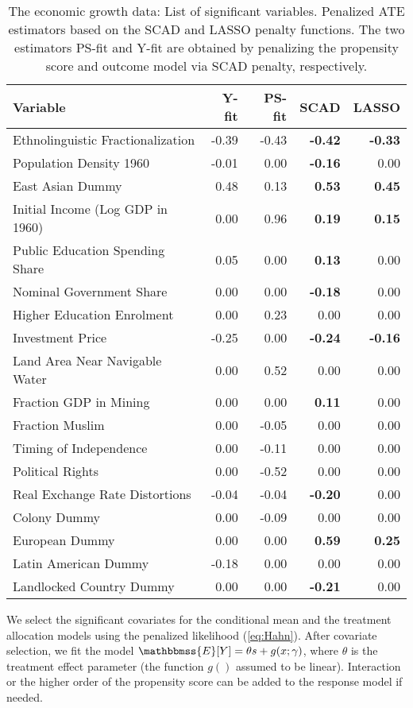 \documentclass[11pt]{statsoc}
\begin{document}
\begin{table}
\caption{The economic growth data: List of significant variables. Penalized ATE estimators based on the SCAD and LASSO penalty functions. The two estimators PS-fit and Y-fit are obtained by penalizing the propensity score and outcome model via SCAD penalty, respectively. }\centering
\begin{tabular}{| l |rrrr|} \hline
  Variable   & Y-fit&PS-fit& SCAD& LASSO\\ \hline
 Ethnolinguistic Fractionalization &-0.39&-0.43& \textbf{-0.42}& \textbf{-0.33}\\
Population Density 1960 &-0.01 &0.00& \textbf{-0.16}& 0.00\\
 East Asian Dummy &0.48 &0.13&\textbf{0.53}& \textbf{0.45}\\
 Initial Income (Log GDP in 1960)    &0.00 &0.96&\textbf{0.19}& \textbf{0.15}\\ 
Public Education Spending Share    &0.05 &0.00&\textbf{0.13}&0.00\\ 
Nominal Government Share    &0.00 &0.00&\textbf{-0.18}&0.00  \\ 
Higher Education Enrolment &0.00 &0.23&0.00&0.00 \\ 
Investment Price    &-0.25 &0.00&\textbf{-0.24}& \textbf{-0.16} \\ 
Land Area Near Navigable Water    &0.00 &0.52&0.00&0.00\\ 
 Fraction GDP in Mining    &0.00 &0.00&\textbf{0.11}&0.00\\
 Fraction Muslim   &0.00 &-0.05&0.00&0.00\\
 Timing of Independence    &0.00 &-0.11&0.00&0.00\\
 Political Rights    &0.00 &-0.52&0.00&0.00\\
 Real Exchange Rate Distortions   &-0.04 &-0.04&\textbf{-0.20}&0.00\\
 Colony Dummy  &0.00 &-0.09&0.00&0.00\\
 European Dummy    &0.00 &0.00&\textbf{0.59}& \textbf{0.25}\\
 Latin American Dummy   &-0.18 &0.00&0.00&0.00\\
 Landlocked Country Dummy   &0.00 &0.00&\textbf{-0.21}&0.00\\ \hline
\end{tabular}
\label{tab:list}
\end{table}

We select the significant covariates  for the conditional mean and the treatment allocation models using the penalized likelihood (\ref{eq:Hahn}).  After covariate selection, we fit the model ${\mathbbmss{E}}[Y] = \theta s+ g(x;\gamma)$, where
$\theta$ is the treatment effect parameter (the function $g()$ assumed to be linear). Interaction or the higher order of the propensity score can be added to the response model if needed.
\end{document}
